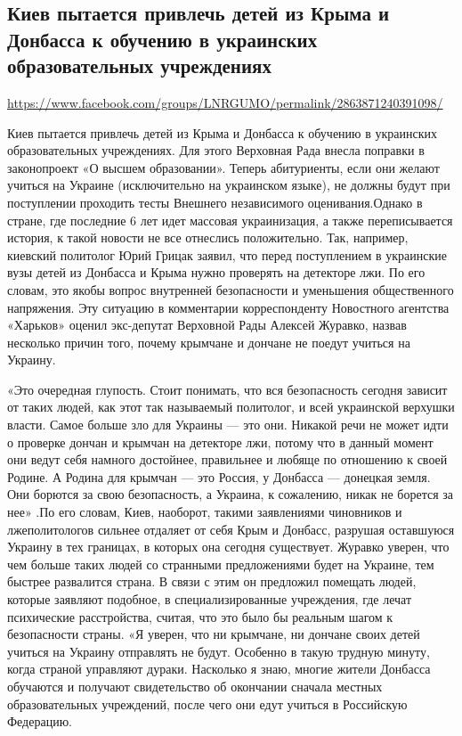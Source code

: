  
 
\subsection{Киев пытается привлечь детей из Крыма и Донбасса к обучению в украинских образовательных учреждениях}
\label{sec:21_07_2020.fb.lnr.16}
\url{https://www.facebook.com/groups/LNRGUMO/permalink/2863871240391098/}
  
  
Киев пытается привлечь детей из Крыма и Донбасса к обучению в украинских
образовательных учреждениях. Для этого Верховная Рада внесла поправки в
законопроект «О высшем образовании». Теперь абитуриенты, если они желают
учиться на Украине (исключительно на украинском языке), не должны будут при
поступлении проходить тесты Внешнего независимого оценивания.Однако в стране,
где последние 6 лет идет массовая украинизация, а также переписывается история,
к такой новости не все отнеслись положительно. Так, например, киевский
политолог Юрий Грицак заявил, что перед поступлением в украинские вузы детей из
Донбасса и Крыма нужно проверять на детекторе лжи. По его словам, это якобы
вопрос внутренней безопасности и уменьшения общественного напряжения. Эту
ситуацию в комментарии корреспонденту Новостного агентства «Харьков» оценил
экс-депутат Верховной Рады Алексей Журавко, назвав несколько причин того,
почему крымчане и дончане не поедут учиться на Украину.

«Это очередная глупость. Стоит понимать, что вся безопасность сегодня зависит
от таких людей, как этот так называемый политолог, и всей украинской верхушки
власти. Самое больше зло для Украины --- это они.  Никакой речи не может идти о
проверке дончан и крымчан на детекторе лжи, потому что в данный момент они
ведут себя намного достойнее, правильнее и любяще по отношению к своей Родине.
А Родина для крымчан --- это Россия, у Донбасса --- донецкая земля. Они борются за
свою безопасность, а Украина, к сожалению, никак не борется за нее» .По его
словам, Киев, наоборот, такими заявлениями чиновников и лжеполитологов сильнее
отдаляет от себя Крым и Донбасс, разрушая оставшуюся Украину в тех границах, в
которых она сегодня существует. Журавко уверен, что чем больше таких людей со
странными предложениями будет на Украине, тем быстрее развалится страна. В
связи с этим он предложил помещать людей, которые заявляют подобное, в
специализированные учреждения, где лечат психические расстройства, считая, что
это было бы реальным шагом к безопасности страны.  «Я уверен, что ни крымчане,
ни дончане своих детей учиться на Украину отправлять не будут. Особенно в такую
трудную минуту, когда страной управляют дураки. Насколько я знаю, многие жители
Донбасса обучаются и получают свидетельство об окончании сначала местных
образовательных учреждений, после чего они едут учиться в Российскую Федерацию.

